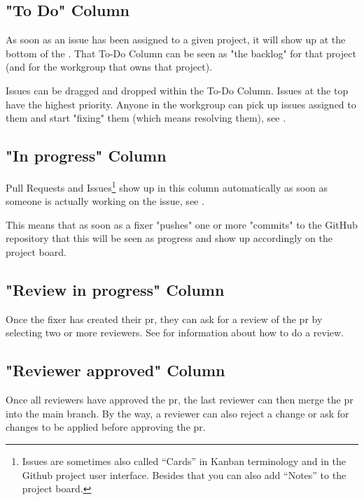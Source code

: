 \subsection{"To Do" Column}
\label{subsec:ekg-mm-process-to-do-column}

As soon as an issue has been assigned to a given project, 
it will show up at the bottom of the . 
That To-Do Column can be seen as "the backlog" 
for that project (and for the workgroup that owns that project).

Issues can be dragged and dropped within the To-Do Column. 
Issues at the top have the highest priority. 
Anyone in the workgroup can pick up issues assigned to 
them and start "fixing" them (which means resolving them), 
see .

\subsection{"In progress" Column}

Pull Requests and Issues\footnote{Issues are sometimes also 
called “Cards” in Kanban terminology and in the Github project 
user interface.
Besides that you can also add “Notes” to the project board.} 
show up in this column automatically as soon as someone is 
actually working on the issue, see .

This means that as soon as a fixer "pushes" one or more "commits" 
to the GitHub repository that this will be seen as progress 
and show up accordingly on the project board.

\subsection{"Review in progress" Column}

Once the fixer has created their \gls{pr}, they can ask 
for a review of the \gls{pr} by selecting two or more reviewers. 
See  for information about how to do a review.

\subsection{"Reviewer approved" Column}

Once all reviewers have approved the \gls{pr}, 
the last reviewer can then merge the \gls{pr} into the main branch. 
By the way, a reviewer can also reject a change or ask for 
changes to be applied before approving the \gls{pr}. 

